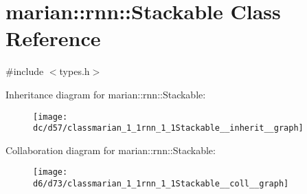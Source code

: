\hypertarget{classmarian_1_1rnn_1_1Stackable}{}\section{marian\+:\+:rnn\+:\+:Stackable Class Reference}
\label{classmarian_1_1rnn_1_1Stackable}


{\ttfamily \#include $<$types.\+h$>$}



Inheritance diagram for marian\+:\+:rnn\+:\+:Stackable\+:
\nopagebreak
\begin{figure}[H]
\begin{center}
\leavevmode
\texttt{[image: dc/d57/classmarian\_1\_1rnn\_1\_1Stackable\_\_inherit\_\_graph]}
\end{center}
\end{figure}


Collaboration diagram for marian\+:\+:rnn\+:\+:Stackable\+:
\nopagebreak
\begin{figure}[H]
\begin{center}
\leavevmode
\texttt{[image: d6/d73/classmarian\_1\_1rnn\_1\_1Stackable\_\_coll\_\_graph]}
\end{center}
\end{figure}
